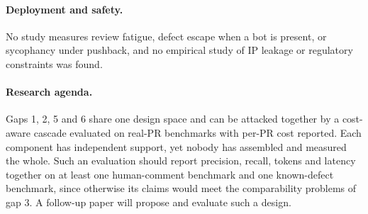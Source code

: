 \paragraph{Deployment and safety.}
No study measures review fatigue, defect escape when a bot is present, or sycophancy under pushback, and no empirical study of IP leakage or regulatory constraints was found.

\paragraph{Research agenda.}
Gaps 1, 2, 5 and 6 share one design space and can be attacked together by a cost-aware cascade evaluated on real-PR benchmarks with per-PR cost reported. Each component has independent support, yet nobody has assembled and measured the whole. Such an evaluation should report precision, recall, tokens and latency together on at least one human-comment benchmark and one known-defect benchmark, since otherwise its claims would meet the comparability problems of gap 3. A follow-up paper will propose and evaluate such a design.
